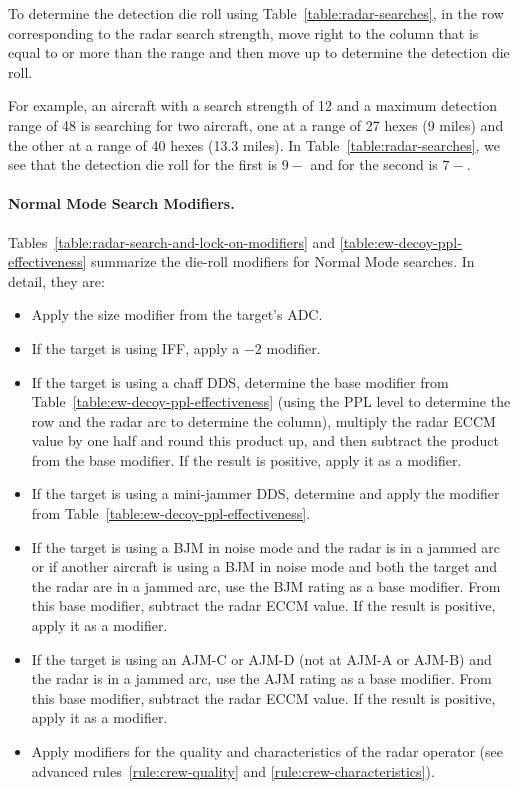 {To determine the detection die roll using Table~\ref{table:radar-searches}, in the row corresponding to the radar search strength, move right to the column that is equal to or more than the range and then move up to determine the detection die roll.

For example, an aircraft with a search strength of 12 and a maximum detection range of 48 is searching for two aircraft, one at a range of 27 hexes (9 miles) and the other at a range of 40 hexes (13.3 miles). In Table~\ref{table:radar-searches}, we see that the detection die roll for the first is $9-$ and for the second is $7-$.


\paragraph{Normal Mode Search Modifiers.} Tables~\ref{table:radar-search-and-lock-on-modifiers} and \ref{table:ew-decoy-ppl-effectiveness} summarize the die-roll modifiers for Normal Mode searches. In detail, they are:
\begin{itemize}
    \item Apply the size modifier from the target’s ADC.
    \item If the target is using IFF, apply a $-2$ modifier.
    \item If the target is using a chaff DDS, determine the base modifier from Table~\ref{table:ew-decoy-ppl-effectiveness} (using the PPL level to determine the row and the radar arc to determine the column), multiply the radar ECCM value by one half and round this product up, and then subtract the product from the base modifier. If the result is positive, apply it as a modifier.
    \item If the target is using a mini-jammer DDS, determine and apply the modifier from Table~\ref{table:ew-decoy-ppl-effectiveness}.
    \item If the target is using a BJM in noise mode and the radar is in a jammed arc or if another aircraft is using a BJM in noise mode and both the target and the radar are in a jammed arc, use the BJM rating as a base modifier. From this base modifier, subtract the radar ECCM value. If the result is positive, apply it as a modifier.
    \item If the target is using an AJM-C or AJM-D (not at AJM-A or AJM-B) and the radar is in a jammed arc, use the AJM rating as a base modifier. From this base modifier, subtract the radar ECCM value. If the result is positive, apply it as a modifier.
    \item Apply modifiers for the quality and characteristics of the radar operator (see advanced rules~\ref{rule:crew-quality} and \ref{rule:crew-characteristics}). 
\end{itemize}



}

